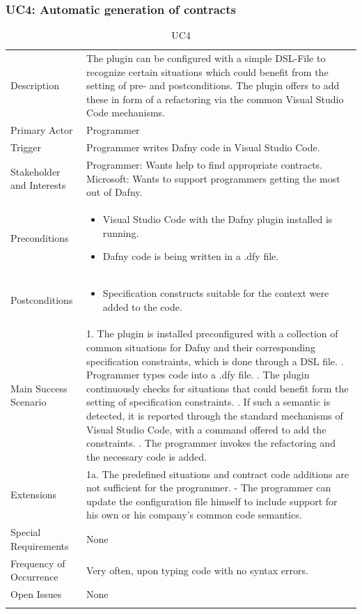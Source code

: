 \subsubsection{UC4: Automatic generation of contracts}\label{autogen}
\begin{longtable}{l | p{} }
	Description & The plugin can be configured with a simple DSL-File to recognize certain situations which could benefit from the setting of pre- and postconditions. The plugin offers to add these in form of a refactoring via the common Visual Studio Code mechanisms.\\ 
	Primary Actor & Programmer\\ 
	Trigger & Programmer writes Dafny code in Visual Studio Code.\\ 
	Stakeholder and Interests & Programmer: Wants help to find appropriate contracts. \newline Microsoft: Wants to support programmers getting the most out of Dafny.\\ 
	Preconditions &
	\begin{itemize}
		\item Visual Studio Code with the Dafny plugin installed is running.
		\item Dafny code is being written in a .dfy file.
	\end{itemize}\\ 
	Postconditions &
	\begin{itemize}
		\item Specification constructs suitable for the context were added to the code.
	\end{itemize}\\ 
	Main Success Scenario & 
	1. The plugin is installed preconfigured with a collection of common situations for Dafny and their corresponding specification constraints, which is done through a DSL file. \newline
	2. Programmer types code into a .dfy file. \newline 
	3. The plugin continuously checks for situations that could benefit form the setting of specification constraints. \newline 
	4. If such a semantic is detected, it is reported through the standard mechanisms of Visual Studio Code, with a command offered to add the constraints. \newline
	5. The programmer invokes the refactoring and the necessary code is added.\\ 
	Extensions & 
	1a. The predefined situations and contract code additions are not sufficient for the programmer. \newline 
	- The programmer can update the configuration file himself to include support for his own or his company's  common code semantics. \\ 
	Special Requirements & None\\ 
	Frequency of Occurrence & Very often, upon typing code with no syntax errors.\\ 
	Open Issues & None \\ 
	\caption{UC4}
\end{longtable}

